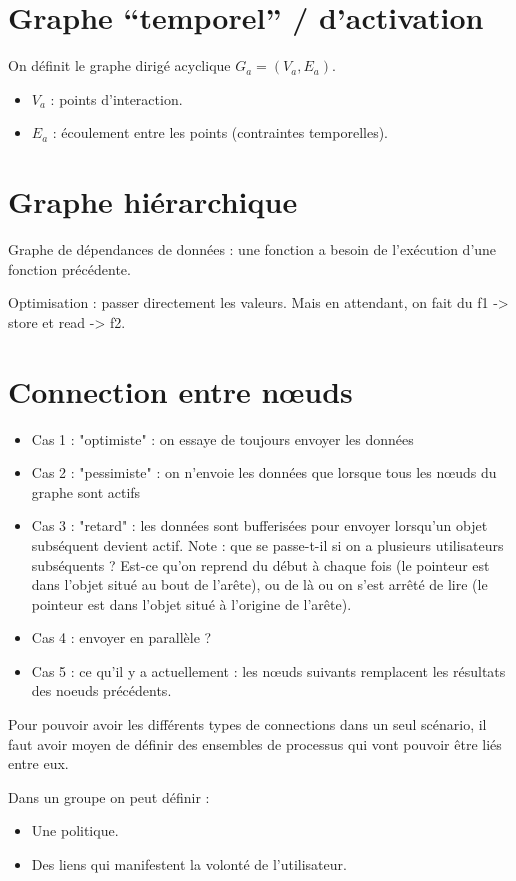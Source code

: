 \documentclass[french,a4paper]{article}
\begin{document}
\section{Graphe ``temporel'' / d'activation}
On définit le graphe dirigé acyclique $G_a=(V_a,E_a)$.
\begin{itemize}
    \item $V_a$ : points d'interaction.
    \item $E_a$ : écoulement entre les points (contraintes temporelles).
\end{itemize}

\section{Graphe hiérarchique}
Graphe de dépendances de données : une fonction a besoin de l'exécution d'une fonction précédente.

Optimisation : passer directement les valeurs. Mais en attendant, on fait du f1 -> store et read -> f2.

\section{Connection entre nœuds}
\begin{itemize}
\item Cas 1 : "optimiste" : on essaye de toujours envoyer les données
\item Cas 2 : "pessimiste" : on n'envoie les données que lorsque tous les nœuds du graphe sont actifs
\item Cas 3 : "retard" : les données sont bufferisées pour envoyer lorsqu'un objet subséquent devient actif. 
Note : que se passe-t-il si on a plusieurs utilisateurs subséquents ?
 Est-ce qu'on reprend du début à chaque fois (le pointeur est dans l'objet situé au bout de l'arête), ou de là ou on s'est arrêté de lire (le pointeur est dans l'objet situé à l'origine de l'arête).
\item Cas 4 : envoyer en parallèle ?
\item Cas 5 : ce qu'il y a actuellement : les nœuds suivants remplacent les résultats des noeuds précédents.
\end{itemize}

Pour pouvoir avoir les différents types de connections dans un seul scénario, il faut avoir moyen de définir des ensembles de processus qui vont pouvoir être liés entre eux.

Dans un groupe on peut définir : 
\begin{itemize}
    \item Une politique.
    \item Des liens qui manifestent la volonté de l'utilisateur.
\end{itemize}
\end{document}
